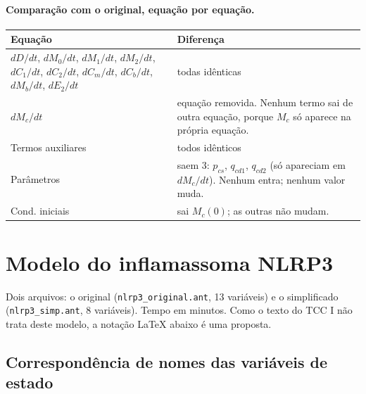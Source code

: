 \documentclass[11pt]{article}
\begin{document}
\paragraph{Comparação com o original, equação por equação.}

\begin{longtable}{p{2.2cm}p{12.3cm}}
\toprule
Equação & Diferença \\
\midrule
\endhead
$dD/dt$, $dM_0/dt$, $dM_1/dt$, $dM_2/dt$, $dC_1/dt$, $dC_2/dt$, $dC_m/dt$, $dC_b/dt$,
$dM_b/dt$, $dE_2/dt$ & todas idênticas \\
$dM_c/dt$ & equação removida. Nenhum termo sai de outra equação, porque $M_c$ só aparece
            na própria equação. \\
Termos auxiliares & todos idênticos \\
Parâmetros & saem 3: $p_{cs}$, $q_{cd1}$, $q_{cd2}$ (só apareciam em $dM_c/dt$). Nenhum
             entra; nenhum valor muda. \\
Cond. iniciais & sai $M_c(0)$; as outras não mudam. \\
\bottomrule
\end{longtable}

\section{Modelo do inflamassoma NLRP3}

Dois arquivos: o original (\texttt{nlrp3\_original.ant}, 13 variáveis) e o simplificado
(\texttt{nlrp3\_simp.ant}, 8 variáveis). Tempo em minutos. Como o texto do TCC I não trata
deste modelo, a notação \LaTeX{} abaixo é uma proposta.

\subsection{Correspondência de nomes das variáveis de estado}
\end{document}
